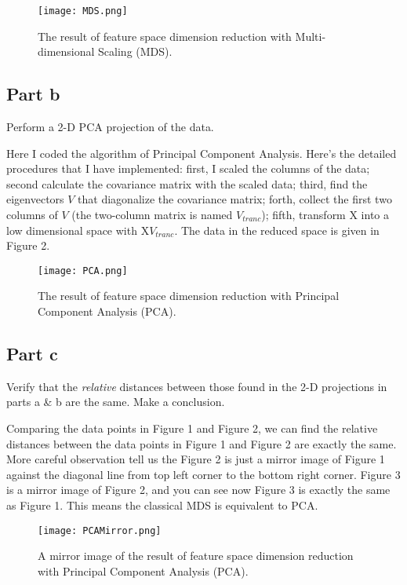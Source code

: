 \documentclass[12pt]{article}
\newcounter{fig}
\begin{document}
\begin{figure}[h!]
  \centering
  \texttt{[image: MDS.png]} 
  \caption{The result of feature space dimension reduction with Multi-dimensional Scaling (MDS).}
 \end{figure}

\subsection*{Part b}
Perform a 2-D PCA projection of the data.

Here I coded the algorithm of Principal Component Analysis. Here's the detailed procedures that I have implemented: first, I scaled the columns of the data; second calculate the covariance matrix with the scaled data; third, find the eigenvectors $V$ that diagonalize the covariance matrix; forth, collect the first two columns of $V$ (the two-column matrix is named $V_{tranc}$); fifth, transform X into a low dimensional space with X$V_{tranc}$. The data in the reduced space is given in Figure 2.

\begin{figure}[h!]
  \centering
  \texttt{[image: PCA.png]} 
  \caption{The result of feature space dimension reduction with Principal Component Analysis (PCA).}
 \end{figure}

\subsection*{Part c}
Verify that the \emph{relative} distances between those found in the 2-D projections in parts a \& b are the same. Make a conclusion.

Comparing the data points in Figure 1 and Figure 2, we can find the relative distances between the data points in Figure 1 and Figure 2 are exactly the same. More careful observation tell us the Figure 2 is just a mirror image of Figure 1 against the diagonal line from top left corner to the bottom right corner. Figure 3 is a mirror image of Figure 2, and you can see now Figure 3 is exactly the same as Figure 1. This means the classical MDS is equivalent to PCA.

\begin{figure}[h!]
  \centering
  \texttt{[image: PCAMirror.png]} 
  \caption{A mirror image of the result of feature space dimension reduction with Principal Component Analysis (PCA).}
 \end{figure}
 
\end{document}
